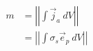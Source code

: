 \begin{equation}
    \begin{split}
    m & = \left|\left| \int \vec{j}_a ~ dV \right|\right| \\
                      & = \left|\left| \int \sigma_s \vec{e}_p ~ dV \right|\right|
    \label{eq:excitation}
    \end{split}
\end{equation}
